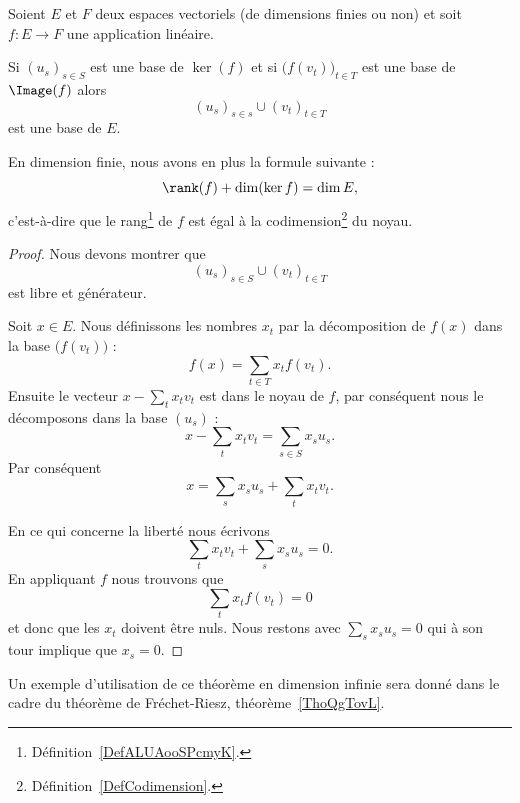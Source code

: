 \begin{theorem}       \label{ThoGkkffA}
	Soient \( E\) et \( F\) deux espaces vectoriels (de dimensions finies ou non) et soit \( f\colon E\to F\) une application linéaire.

	Si \( (u_s)_{s\in S}\) est une base de \( \ker(f)\) et si \( \big( f(v_t) \big)_{t\in T}\) est une base de \( \Image(f)\) alors
	\begin{equation}
		(u_s)_{s\in s}\cup (v_t)_{t\in T}
	\end{equation}
	est une base de \( E\).

	En dimension finie, nous avons en plus la formule suivante :
	\begin{equation}     \label{EQooUEOQooLySRiE}
		\rank(f)+\dim(\ker f)=\dim E,
	\end{equation}
	c'est-à-dire que le rang\footnote{Définition~\ref{DefALUAooSPcmyK}.} de \( f\) est égal à la codimension\footnote{Définition~\ref{DefCodimension}.} du noyau.
\end{theorem}

\begin{proof}
	Nous devons montrer que
	\begin{equation}
		(u_s)_{s\in S}\cup (v_t)_{t\in T}
	\end{equation}
	est libre et générateur.

	Soit \( x\in E\). Nous définissons les nombres \( x_t\) par la décomposition de \( f(x)\) dans la base \( \big( f(v_t) \big)\) :
	\begin{equation}
		f(x)=\sum_{t\in T}x_tf(v_t).
	\end{equation}
	Ensuite le vecteur \( x-\sum_tx_tv_t\) est dans le noyau de \( f\), par conséquent nous le décomposons dans la base \( (u_s)\) :
	\begin{equation}
		x-\sum_tx_tv_t=\sum_{s\in S} x_su_s.
	\end{equation}
	Par conséquent
	\begin{equation}
		x=\sum_sx_su_s+\sum_tx_tv_t.
	\end{equation}

	En ce qui concerne la liberté nous écrivons
	\begin{equation}
		\sum_tx_tv_t+\sum_sx_su_s=0.
	\end{equation}
	En appliquant \( f\) nous trouvons que
	\begin{equation}
		\sum_tx_tf(v_t)=0
	\end{equation}
	et donc que les \( x_t\) doivent être nuls. Nous restons avec \( \sum_sx_su_s=0\) qui à son tour implique que \( x_s=0\).
\end{proof}
Un exemple d'utilisation de ce théorème en dimension infinie sera donné dans le cadre du théorème de Fréchet-Riesz, théorème~\ref{ThoQgTovL}.



